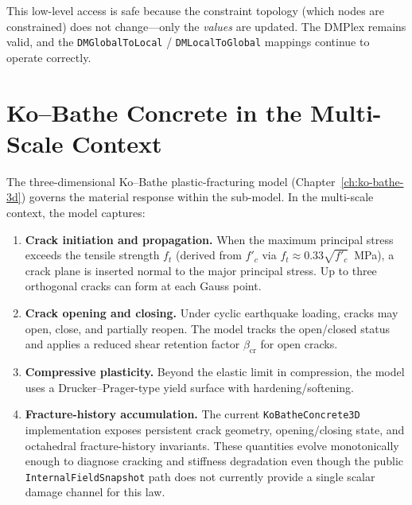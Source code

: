 This low-level access is safe because the constraint topology
(which nodes are constrained) does not change---only the
\emph{values} are updated.  The DMPlex remains valid, and the
\texttt{DMGlobalToLocal} / \texttt{DMLocalToGlobal} mappings
continue to operate correctly.


\section{Ko--Bathe Concrete in the Multi-Scale Context}
\label{sec:nlevo-ko-bathe}

The three-dimensional Ko--Bathe plastic-fracturing model
(Chapter~\ref{ch:ko-bathe-3d}) governs the material response within
the sub-model.  In the multi-scale context, the model captures:

\begin{enumerate}
  \item \textbf{Crack initiation and propagation.}  When the maximum
        principal stress exceeds the tensile strength $f_t$
        (derived from $f'_c$ via $f_t \approx 0.33\sqrt{f'_c}$~MPa),
        a crack plane is inserted normal to the major principal stress.
        Up to three orthogonal cracks can form at each Gauss point.

  \item \textbf{Crack opening and closing.}  Under cyclic earthquake
        loading, cracks may open, close, and partially reopen.  The
        model tracks the open/closed status and applies a reduced
        shear retention factor $\beta_{\mathrm{cr}}$ for open cracks.

  \item \textbf{Compressive plasticity.}  Beyond the elastic limit in
        compression, the model uses a Drucker--Prager-type yield
        surface with hardening/softening.

  \item \textbf{Fracture-history accumulation.}  The current
        \texttt{KoBatheConcrete3D} implementation exposes persistent crack
        geometry, opening/closing state, and octahedral fracture-history
        invariants.  These quantities evolve monotonically enough to diagnose
        cracking and stiffness degradation even though the public
        \texttt{InternalFieldSnapshot} path does not currently provide a single
        scalar damage channel for this law.
\end{enumerate}

